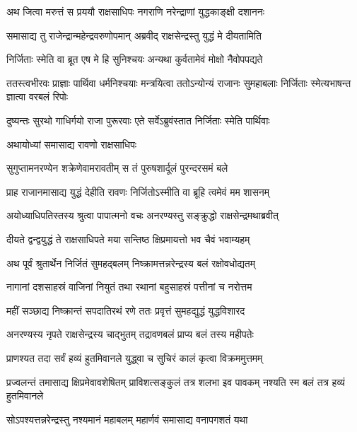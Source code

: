 
\twolineshloka
{अथ जित्वा मरुत्तं स प्रययौ राक्षसाधिपः}
{नगराणि नरेन्द्राणां युद्धकाङ्क्षी दशाननः} %

\twolineshloka
{समासाद्य तु राजेन्द्रान्महेन्द्रवरुणोपमान्}
{अब्रवीद् राक्षसेन्द्रस्तु युद्धं मे दीयतामिति} %

\twolineshloka
{निर्जिताः स्मेति वा ब्रूत एष मे हि सुनिश्चयः}
{अन्यथा कुर्वतामेवं मोक्षो नैवोपपद्यते} %

\threelineshloka
{ततस्त्वभीरवः प्राज्ञाः पार्थिवा धर्मनिश्चयाः}
{मन्त्रयित्वा ततोऽन्योन्यं राजानः सुमहाबलाः}
{निर्जिताः स्मेत्यभाषन्त ज्ञात्वा वरबलं रिपोः} %

\twolineshloka
{दुष्यन्तः सुरथो गाधिर्गयो राजा पुरूरवाः}
{एते सर्वेऽब्रुवंस्तात निर्जिताः स्मेति पार्थिवाः} %

\onelineshloka
{अथायोध्यां समासाद्य रावणो राक्षसाधिपः} %

\twolineshloka
{सुगुप्तामनरण्येन शक्रेणेवामरावतीम्}
{स तं पुरुषशार्दूलं पुरन्दरसमं बले} %

\twolineshloka
{प्राह राजानमासाद्य युद्धं देहीति रावणः}
{निर्जितोऽस्मीति वा ब्रूहि त्वमेवं मम शासनम्} %

\twolineshloka
{अयोध्याधिपतिस्तस्य श्रुत्वा पापात्मनो वचः}
{अनरण्यस्तु सङ्क्रुद्धो राक्षसेन्द्रमथाब्रवीत्} %

\twolineshloka
{दीयते द्वन्द्वयुद्धं ते राक्षसाधिपते मया}
{सन्तिष्ठ क्षिप्रमायत्तो भव चैवं भवाम्यहम्} %

\twolineshloka
{अथ पूर्वं श्रुतार्थेन निर्जितं सुमहद्बलम्}
{निष्क्रामत्तन्नरेन्द्रस्य बलं रक्षोवधोद्यतम्} %

\twolineshloka
{नागानां दशसाहस्रं वाजिनां नियुतं तथा}
{रथानां बहुसाहस्रं पत्तीनां च नरोत्तम} %

\twolineshloka
{महीं सञ्छाद्य निष्क्रान्तं सपदातिरथं रणे}
{ततः प्रवृत्तं सुमहद्युद्धं युद्धविशारद} %

\twolineshloka
{अनरण्यस्य नृपते राक्षसेन्द्रस्य चाद्भुतम्}
{तद्रावणबलं प्राप्य बलं तस्य महीपतेः} %

\twolineshloka
{प्राणश्यत तदा सर्वं हव्यं हुतमिवानले}
{युद्ध्वा च सुचिरं कालं कृत्वा विक्रममुत्तमम्} %

\threelineshloka
{प्रज्वलन्तं तमासाद्य क्षिप्रमेवावशेषितम्}
{प्राविशत्सङ्कुलं तत्र शलभा इव पावकम्}
{नश्यति स्म बलं तत्र हव्यं हुतमिवानले} %

\twolineshloka
{सोऽपश्यत्तन्नरेन्द्रस्तु नश्यमानं महाबलम्}
{महार्णवं समासाद्य वनापगशतं यथा} %


